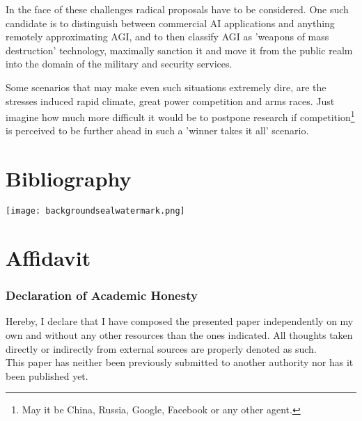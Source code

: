 \documentclass[12pt, a4paper]{article}
\begin{document}
			In the face of these challenges radical proposals have to be considered.
			One such candidate is to distinguish between commercial AI applications and anything remotely approximating AGI, and to then classify AGI as 'weapons of mass destruction' technology, maximally sanction it and move it from the public realm into the domain of the military and security services.
			
			Some scenarios that may make even such situations extremely dire, are the stresses induced rapid climate, great power competition and arms races.
			Just imagine how much more difficult it would be to postpone research if competition\footnote{May it be China, Russia, Google, Facebook or any other agent.} is perceived to be further ahead in such a 'winner takes it all' scenario.
			
				
	\newpage \part*{Bibliography}
		 \setcounter{page}{1}    

    \printbibliography
    \newpage
    

					
    \newpage

		\flushright \texttt{[image: backgroundsealwatermark.png]}\\[2cm]
		        \centering 
\part*{Affidavit}

	    \vspace{2cm}
    \section*{Declaration of Academic Honesty}
	    
	    Hereby, I declare that I have composed the presented paper independently on my own and without any other resources than the ones indicated. All thoughts taken directly or indirectly from external sources are properly denoted as such.
	     \vspace{\baselineskip}
	    \\  This paper has neither been previously submitted to another authority nor has it been published yet.
	    \vspace{6cm}
	    
\end{document}
